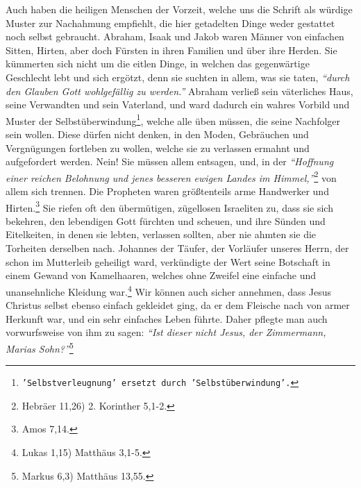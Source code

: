 Auch haben die heiligen Menschen der Vorzeit, welche uns die
Schrift als würdige
Muster zur Nachahmung empfiehlt, die hier getadelten Dinge weder gestattet noch
selbst gebraucht. Abraham, Isaak
und
Jakob waren Männer von einfachen Sitten,
Hirten, aber doch Fürsten in ihren Familien und über ihre Herden. Sie
kümmerten sich nicht um die eitlen Dinge, in welchen das gegenwärtige
Geschlecht lebt und sich ergötzt, denn sie suchten in allem, was sie taten,
\textit{"`durch den Glauben Gott wohlgefällig zu werden."'} Abraham verließ sein
väterliches Haus, seine Verwandten und sein Vaterland, und ward dadurch ein
wahres Vorbild und Muster der
Selbstüberwindung\footnote{\texttt{'Selbstverleugnung'
ersetzt durch 'Selbstüberwindung'.}}, welche alle üben müssen, die
seine Nachfolger sein wollen. Diese dürfen nicht denken, in den Moden,
Gebräuchen und Vergnügungen fortleben zu wollen, welche sie zu verlassen
ermahnt und aufgefordert werden. Nein! Sie müssen allem
entsagen, und, in der
\textit{"`Hoffnung einer reichen Belohnung und jenes besseren ewigen Landes im
Himmel,"'}\footnote{Hebräer 11,26) 2. Korinther
5,1-2.}
von allem sich trennen. Die
Propheten waren größtenteils arme Handwerker und
Hirten.\footnote{Amos 7,14.}
Sie riefen oft den übermütigen, zügellosen
Israeliten zu, dass sie
sich bekehren,
den lebendigen Gott fürchten und scheuen, und ihre
Sünden und Eitelkeiten, in
denen sie lebten, verlassen sollten, aber nie ahmten sie die Torheiten
derselben nach. Johannes der Täufer, der
Vorläufer unseres
Herrn, der schon im
Mutterleib geheiligt ward, verkündigte der Wert seine Botschaft
in einem
Gewand von Kamelhaaren, welches ohne Zweifel eine einfache und unansehnliche
Kleidung war.\footnote{Lukas 1,15) Matthäus
3,1-5.}
Wir können auch sicher annehmen,
dass Jesus Christus selbst ebenso einfach gekleidet ging, da er dem Fleische
nach von armer Herkunft war, und ein sehr einfaches
Leben
führte. Daher pflegte
man auch vorwurfsweise von ihm zu sagen:
\textit{"`Ist dieser nicht Jesus, der
Zimmermann, Marias Sohn?"'}\footnote{Markus 6,3) Matthäus 13,55.}
